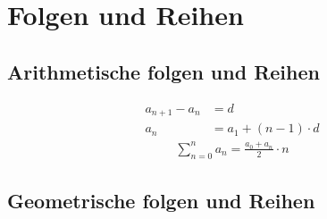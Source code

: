 \section{Folgen und Reihen}
\subsection{Arithmetische folgen und Reihen}

\begin{align*}
a_{n+1} - a_n &=d	\\
a_n &= a_1+(n-1) \cdot d
 \end{align*}
\begin{align*}
         \sum_{n=0}^{n} a_n = \frac{a_0+a_n}{2} \cdot n
 \end{align*}
 


\subsection{Geometrische folgen und Reihen}